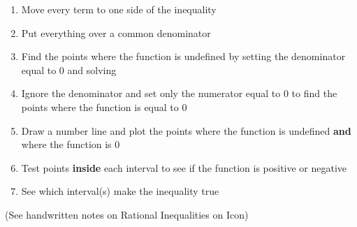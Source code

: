 \documentclass[12pt]{article}
\begin{document}
\begin{enumerate}

\item Move every term to one side of the inequality
\item Put everything over a common denominator
\item Find the points where the function is undefined by setting the denominator equal to $0$ and solving
\item Ignore the  denominator and set only the numerator equal to $0$ to find the points where the function is equal to $0$
\item Draw a number line and plot the points where the function is undefined \textbf{and} where the function is $0$
\item Test points \textbf{inside} each interval to see if the function is positive or negative
\item See which interval(s) make the inequality true

\end{enumerate}

(See handwritten notes on Rational Inequalities on Icon)
\end{document}
